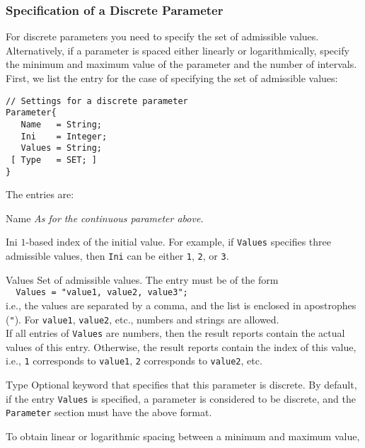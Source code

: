 \subsubsection{Specification of a Discrete Parameter}
\label{subsubsec:SpeDisPar}
For discrete parameters you need to 
specify the set of admissible values.
Alternatively, if a parameter is spaced either 
linearly or logarithmically, 
specify the minimum and maximum value of the parameter and the number of intervals.\\

First, we list the entry for the case of specifying the set of admissible values:
\begin{lstlisting}
// Settings for a discrete parameter
Parameter{
   Name   = String;
   Ini    = Integer;
   Values = String;
 [ Type   = SET; ]
}
\end{lstlisting}
The entries are:
\begin{codedescription}
\item [Name] {\it As for the continuous parameter above.}

\item [Ini] $1$-based index of the initial value. For example, if \verb$Values$ specifies three admissible values, then \verb$Ini$ can be either \verb$1$, \verb$2$, or \verb$3$.

\item [Values] Set of admissible values. The entry must be of the form\\
\verb$  Values = "value1, value2, value3";$\\
i.e., the values are separated by a comma,
and the list is enclosed in apostrophes (\verb$"$). 
For \verb$value1$, \verb$value2$, etc., numbers and strings are allowed.\\
If all entries of \verb$Values$ are numbers, then the result reports contain the actual values of this entry. Otherwise, the result reports contain the index of this value, i.e., \verb$1$ corresponds to \verb$value1$, \verb$2$ corresponds to \verb$value2$, etc.

\item [Type] Optional keyword that specifies that this parameter is discrete. By default, if the entry \verb$Values$ is specified, a parameter is considered to be discrete, and the \verb$Parameter$ section must have the above format.
\end{codedescription}
\vspace{2\baselineskip}
To obtain linear or logarithmic spacing between a minimum and maximum value,
